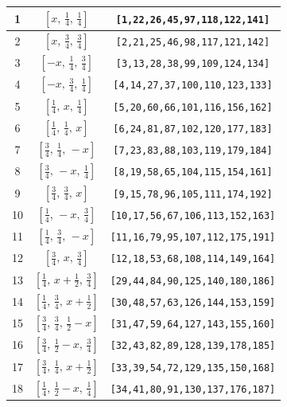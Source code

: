 \documentclass[fleqn,8pt]{jsarticle}
\begin{document}
\begin{longtable}{ccc}
1 & $\left[ x,\, \frac{1}{4},\, \frac{1}{4} \right]$ & {\tt [1,22,26,45,97,118,122,141]} \\ \hline
2 & $\left[ x,\, \frac{3}{4},\, \frac{3}{4} \right]$ & {\tt [2,21,25,46,98,117,121,142]} \\ \hline
3 & $\left[ - x,\, \frac{1}{4},\, \frac{3}{4} \right]$ & {\tt [3,13,28,38,99,109,124,134]} \\ \hline
4 & $\left[ - x,\, \frac{3}{4},\, \frac{1}{4} \right]$ & {\tt [4,14,27,37,100,110,123,133]} \\ \hline
5 & $\left[ \frac{1}{4},\, x,\, \frac{1}{4} \right]$ & {\tt [5,20,60,66,101,116,156,162]} \\ \hline
6 & $\left[ \frac{1}{4},\, \frac{1}{4},\, x \right]$ & {\tt [6,24,81,87,102,120,177,183]} \\ \hline
7 & $\left[ \frac{3}{4},\, \frac{1}{4},\, - x \right]$ & {\tt [7,23,83,88,103,119,179,184]} \\ \hline
8 & $\left[ \frac{3}{4},\, - x,\, \frac{1}{4} \right]$ & {\tt [8,19,58,65,104,115,154,161]} \\ \hline
9 & $\left[ \frac{3}{4},\, \frac{3}{4},\, x \right]$ & {\tt [9,15,78,96,105,111,174,192]} \\ \hline
10 & $\left[ \frac{1}{4},\, - x,\, \frac{3}{4} \right]$ & {\tt [10,17,56,67,106,113,152,163]} \\ \hline
11 & $\left[ \frac{1}{4},\, \frac{3}{4},\, - x \right]$ & {\tt [11,16,79,95,107,112,175,191]} \\ \hline
12 & $\left[ \frac{3}{4},\, x,\, \frac{3}{4} \right]$ & {\tt [12,18,53,68,108,114,149,164]} \\ \hline
13 & $\left[ \frac{1}{4},\, x + \frac{1}{2},\, \frac{3}{4} \right]$ & {\tt [29,44,84,90,125,140,180,186]} \\ \hline
14 & $\left[ \frac{1}{4},\, \frac{3}{4},\, x + \frac{1}{2} \right]$ & {\tt [30,48,57,63,126,144,153,159]} \\ \hline
15 & $\left[ \frac{3}{4},\, \frac{3}{4},\, \frac{1}{2} - x \right]$ & {\tt [31,47,59,64,127,143,155,160]} \\ \hline
16 & $\left[ \frac{3}{4},\, \frac{1}{2} - x,\, \frac{3}{4} \right]$ & {\tt [32,43,82,89,128,139,178,185]} \\ \hline
17 & $\left[ \frac{3}{4},\, \frac{1}{4},\, x + \frac{1}{2} \right]$ & {\tt [33,39,54,72,129,135,150,168]} \\ \hline
18 & $\left[ \frac{1}{4},\, \frac{1}{2} - x,\, \frac{1}{4} \right]$ & {\tt [34,41,80,91,130,137,176,187]} \\ \hline

\end{longtable}
\end{document}
